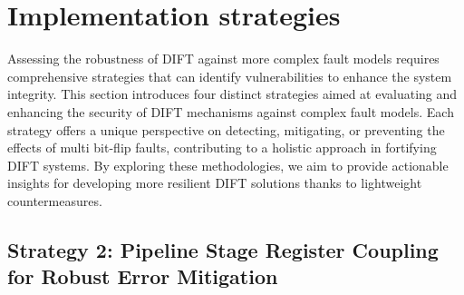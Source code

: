 \section{Implementation strategies}
\label{section:chap6_implem_strategies}

Assessing the robustness of DIFT against more complex fault models requires comprehensive strategies that can identify vulnerabilities to enhance the system integrity. This section introduces four distinct strategies aimed at evaluating and enhancing the security of DIFT mechanisms against complex fault models. Each strategy offers a unique perspective on detecting, mitigating, or preventing the effects of multi bit-flip faults, contributing to a holistic approach in fortifying DIFT systems. By exploring these methodologies, we aim to provide actionable insights for developing more resilient DIFT solutions thanks to lightweight countermeasures.

\subsection{Strategy 2: Pipeline Stage Register Coupling for Robust Error Mitigation}

